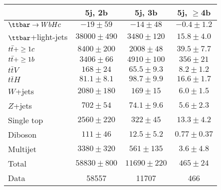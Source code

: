 \begin{table}[htbp]
\begin{center}
\begin{tabular}{l*{3}{c}}
\hline\hline
 & 5j, 2b & 5j, 3b & 5j, $\geq$4b \\
\hline
$\Hc$  &   $ -19 \pm 59 $ &   $ -14 \pm 48 $ &   $ -0.4 \pm 1.2 $ \\ 
\hline
$\ttbar$+light-jets  &   $ 38000 \pm 490 $ &   $ 3480 \pm 120 $ &   $ 15.8 \pm 4.0 $ \\ 
$t\bar{t}+\geq1c$  &   $ 8400 \pm 200 $ &   $ 2008 \pm 48 $ &   $ 39.5 \pm 7.7 $ \\ 
$t\bar{t}+\geq1b$  &   $ 3406 \pm 66 $ &   $ 4910 \pm 100 $ &   $ 356 \pm 21 $ \\ 
$t\bar{t}V$  &   $ 168 \pm 24 $ &   $ 65.5 \pm 9.3 $ &   $ 8.2 \pm 1.2 $ \\ 
$t\bar{t}H$  &   $ 81.1 \pm 8.1 $ &   $ 98.7 \pm 9.9 $ &   $ 16.6 \pm 1.7 $ \\ 
$W$+jets  &   $ 2080 \pm 180 $ &   $ 169 \pm 15 $ &   $ 6.0 \pm 1.5 $ \\ 
$Z$+jets  &   $ 702 \pm 54 $ &   $ 74.1 \pm 9.6 $ &   $ 5.6 \pm 2.3 $ \\ 
Single top  &   $ 2560 \pm 220 $ &   $ 322 \pm 45 $ &   $ 13.3 \pm 4.2 $ \\ 
Diboson  &   $ 111 \pm 46 $ &   $ 12.5 \pm 5.2 $ &   $ 0.77 \pm 0.37 $ \\ 
Multijet  &   $ 3380 \pm 320 $ &   $ 561 \pm 135 $ &   $ 3.6 \pm 4.8 $ \\ 
\hline
Total & $ 58830 \pm 800 $ &   $ 11690 \pm 220 $ &   $ 465 \pm 24 $ \\
\hline
Data & 58557  & 11707  & 466  \\ 
\hline\hline      
\end{tabular}
\vspace{0.2cm}


\end{center}
\end{table}
